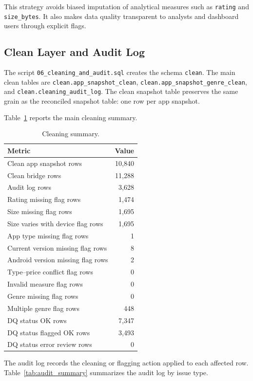 \documentclass[11pt,a4paper]{article}
\begin{document}
This strategy avoids biased imputation of analytical measures such as \texttt{rating} and \texttt{size\_bytes}. It also makes data quality transparent to analysts and dashboard users through explicit flags.

\subsection{Clean Layer and Audit Log}
The script \texttt{06\_cleaning\_and\_audit.sql} creates the schema \texttt{clean}. The main clean tables are \texttt{clean.app\_snapshot\_clean}, \texttt{clean.app\_snapshot\_genre\_clean}, and \texttt{clean.cleaning\_audit\_log}. The clean snapshot table preserves the same grain as the reconciled snapshot table: one row per app snapshot.

Table~\ref{tab:cleaning_summary} reports the main cleaning summary.

\begin{table}[H]
\centering
\caption{Cleaning summary.}
\label{tab:cleaning_summary}
\begin{tabular}{@{}lr@{}}
\toprule
\textbf{Metric} & \textbf{Value} \\
\midrule
Clean app snapshot rows & 10,840 \\
Clean bridge rows & 11,288 \\
Audit log rows & 3,628 \\
Rating missing flag rows & 1,474 \\
Size missing flag rows & 1,695 \\
Size varies with device flag rows & 1,695 \\
App type missing flag rows & 1 \\
Current version missing flag rows & 8 \\
Android version missing flag rows & 2 \\
Type--price conflict flag rows & 0 \\
Invalid measure flag rows & 0 \\
Genre missing flag rows & 0 \\
Multiple genre flag rows & 448 \\
DQ status OK rows & 7,347 \\
DQ status flagged OK rows & 3,493 \\
DQ status error review rows & 0 \\
\bottomrule
\end{tabular}
\end{table}

The audit log records the cleaning or flagging action applied to each affected row. Table~\ref{tab:audit_summary} summarizes the audit log by issue type.
\end{document}
